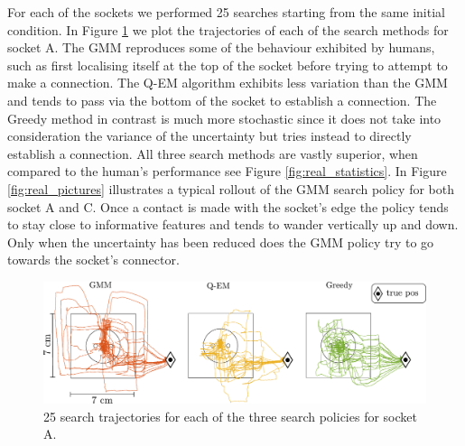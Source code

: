 For each of the sockets we performed 25 searches starting from the same initial condition. In Figure \ref{fig:real_policy} we plot
the trajectories of each of the search methods for socket A. The GMM reproduces some of the behaviour exhibited by humans, such as 
first localising itself at the top of the socket before trying to attempt to make a connection. The Q-EM algorithm exhibits less variation
than the GMM and tends to pass via the bottom of the socket to establish a connection. The Greedy method in contrast is much more  
stochastic since it does not take into consideration the variance of the uncertainty but tries instead to directly establish a connection.
All three search methods are vastly superior, when compared to the human's performance 
see Figure \ref{fig:real_statistics}.  In Figure \ref{fig:real_pictures} illustrates a typical rollout of the GMM search policy for both 
socket A and C. Once a contact is made with the socket's edge the policy tends to stay close to informative features and tends to 
wander vertically up and down. Only when the uncertainty has been reduced does the GMM policy try to go towards the socket's connector. 

\begin{figure}
 \centering
    \includegraphics[width=\textwidth]{./ch4-PiH/Figures/Results2/socket_connection_A.pdf}
    \caption{%
    25 search trajectories for each of the three search policies for socket A. }
    \label{fig:real_policy}
\end{figure}



